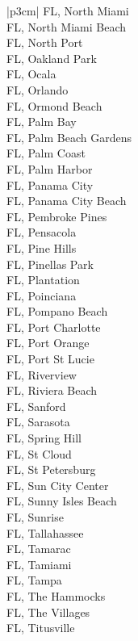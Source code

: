 \begin{customLongTable}{ |p{3cm}| }
FL, North Miami \\ \hline
FL, North Miami Beach \\ \hline
FL, North Port \\ \hline
FL, Oakland Park \\ \hline
FL, Ocala \\ \hline
FL, Orlando \\ \hline
FL, Ormond Beach \\ \hline
FL, Palm Bay \\ \hline
FL, Palm Beach Gardens \\ \hline
FL, Palm Coast \\ \hline
FL, Palm Harbor \\ \hline
FL, Panama City \\ \hline
FL, Panama City Beach \\ \hline
FL, Pembroke Pines \\ \hline
FL, Pensacola \\ \hline
FL, Pine Hills \\ \hline
FL, Pinellas Park \\ \hline
FL, Plantation \\ \hline
FL, Poinciana \\ \hline
FL, Pompano Beach \\ \hline
FL, Port Charlotte \\ \hline
FL, Port Orange \\ \hline
FL, Port St Lucie \\ \hline
FL, Riverview \\ \hline
FL, Riviera Beach \\ \hline
FL, Sanford \\ \hline
FL, Sarasota \\ \hline
FL, Spring Hill \\ \hline
FL, St Cloud \\ \hline
FL, St Petersburg \\ \hline
FL, Sun City Center \\ \hline
FL, Sunny Isles Beach \\ \hline
FL, Sunrise \\ \hline
FL, Tallahassee \\ \hline
FL, Tamarac \\ \hline
FL, Tamiami \\ \hline
FL, Tampa \\ \hline
FL, The Hammocks \\ \hline
FL, The Villages \\ \hline
FL, Titusville \\ \hline

\end{customLongTable}

